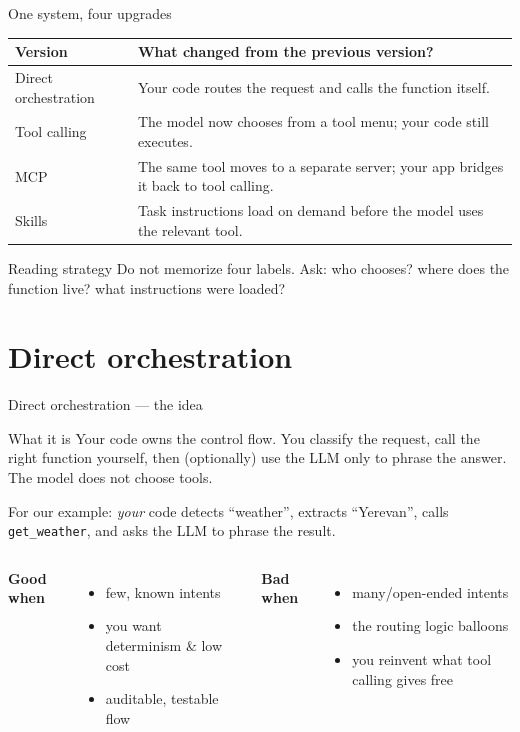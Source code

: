 \documentclass[aspectratio=169,10pt]{beamer}
\begin{document}
\begin{frame}{One system, four upgrades}
  \small
  \begin{tabular}{@{}p{3.0cm}p{7.2cm}@{}}
    \toprule
    \textbf{Version} & \textbf{What changed from the previous version?} \\
    \midrule
    Direct orchestration & Your code routes the request and calls the function itself. \\
    Tool calling & The model now chooses from a tool menu; your code still executes. \\
    MCP & The same tool moves to a separate server; your app bridges it back to tool calling. \\
    Skills & Task instructions load on demand before the model uses the relevant tool. \\
    \bottomrule
  \end{tabular}
  \vfill
  \begin{block}{Reading strategy}
    \footnotesize Do not memorize four labels. Ask: \alert{who chooses? where does the function live? what instructions were loaded?}
  \end{block}
\end{frame}
\section{Direct orchestration}

\begin{frame}{Direct orchestration --- the idea}
  \begin{block}{What it is}
    \alert{Your code} owns the control flow. You classify the request, call the right
    function yourself, then (optionally) use the LLM only to phrase the answer. The model
    does \alert{not} choose tools.
  \end{block}
  \footnotesize For our example: \emph{your} code detects ``weather'', extracts ``Yerevan'',
  calls \texttt{get\_weather}, and asks the LLM to phrase the result.
  \begin{columns}[T]
    \textbf{Good when}
      \begin{itemize}\small \item few, known intents \item you want determinism \& low cost \item auditable, testable flow \end{itemize}
    \textbf{Bad when}
      \begin{itemize}\small \item many/open-ended intents \item the routing logic balloons \item you reinvent what tool calling gives free \end{itemize}
  \end{columns}
\end{frame}
\end{document}
